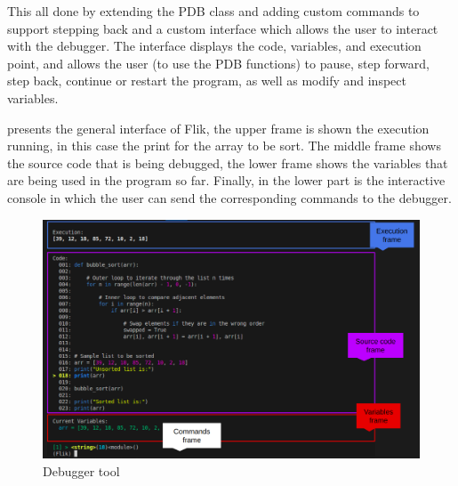 This all done by extending the PDB class and adding custom commands to support stepping back
and a custom interface which allows the user to interact with the debugger. The interface 
displays the code, variables, and execution point, and allows the user (to use the \ac{PDB} 
functions) to pause, step forward, step back, continue or restart the program, as well as 
modify and inspect variables. 

 presents the general interface of \ac{Flik}, 
the upper frame is shown the execution running, in this case the print 
for the array to be sort. The middle frame shows the source code that is being 
debugged, the lower frame shows the variables that are being used in the 
program so far. Finally, in the lower part is the interactive console in which the user can 
send the corresponding commands to the debugger.

\begin{figure}[h]
    \centering
    \includegraphics[width=1\textwidth]{figures/flik_interface.png}
    \caption{Debugger tool}
    \label{fig:debuggerf}
\end{figure}

